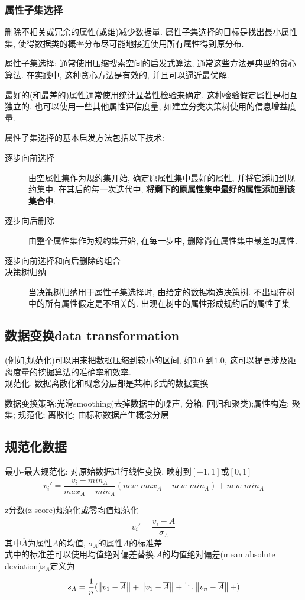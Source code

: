 \documentclass{article}
\begin{document}
\subsubsection{属性子集选择}
删除不相关或冗余的属性(或维)减少数据量. 属性子集选择的目标是找出最小属性集, 使得数据类的概率分布尽可能地接近使用所有属性得到原分布.

属性子集选择: 通常使用压缩搜索空间的启发式算法, 通常这些方法是典型的贪心算法. 在实践中, 这种贪心方法是有效的, 并且可以逼近最优解.

最好的(和最差的)属性通常使用统计显著性检验来确定. 这种检验假定属性是相互独立的, 也可以使用一些其他属性评估度量, 如建立分类决策树使用的信息增益度量.

属性子集选择的基本启发方法包括以下技术:
\begin{description}
\item [逐步向前选择] 由空属性集作为规约集开始, 确定原属性集中最好的属性, 并将它添加到规约集中. 在其后的每一次迭代中, \textbf{将剩下的原属性集中最好的属性添加到该集合中}.
\item [逐步向后删除] 由整个属性集作为规约集开始, 在每一步中, 删除尚在属性集中最差的属性.
\item [逐步向前选择和向后删除的组合]
\item [决策树归纳] 当决策树归纳用于属性子集选择时, 由给定的数据构造决策树. 不出现在树中的所有属性假定是不相关的. 出现在树中的属性形成规约后的属性子集
\end{description}

\subsection{数据变换data transformation}
(例如,规范化)可以用来把数据压缩到较小的区间, 如$0.0$ 到$1.0$, 这可以提高涉及距离度量的挖掘算法的准确率和效率.\\
规范化, 数据离散化和概念分层都是某种形式的数据变换

数据变换策略:光滑smoothing(去掉数据中的噪声, 分箱, 回归和聚类);属性构造; 聚集; 规范化; 离散化; 由标称数据产生概念分层

\subsection{规范化数据}
最小-最大规范化: 对原始数据进行线性变换, 映射到$[-1,1]$或$[0,1]$
$$
v_i' = \dfrac{v_i - min_A }{max_A - min_A}(new\_max_A - new\_min_A) + new\_min_A
$$

z分数(z-score)规范化或零均值规范化
$$
v_i' = \dfrac{ v_i - \overline{A}}{\sigma_A}
$$
其中$\overline{A}$为属性$A$的均值, $\sigma_A$的属性$A$的标准差 \\
式中的标准差可以使用均值绝对偏差替换,$A$的均值绝对偏差(mean absolute deviation)$s_A$定义为
$$
s_A = \dfrac{1}{n}( \left\Vert v_1 - \overline{A}\right\Vert+ \left\Vert v_1 - \overline{A}\right\Vert+ \ddots \left\Vert v_n - \overline{A}\right\Vert+)
$$
\end{document}
